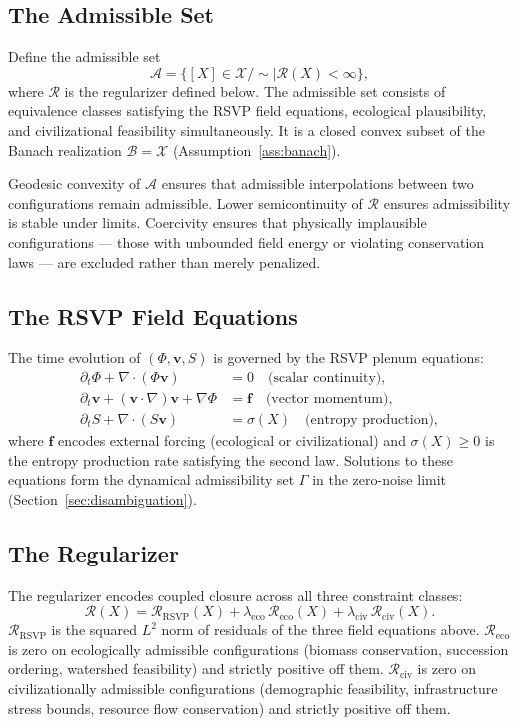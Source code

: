 \documentclass[11pt, oneside]{article}
\begin{document}
\subsection{The Admissible Set}

Define the admissible set
\[
\mathcal{A} = \{ [X] \in \mathcal{X}/{\sim} \mid \mathcal{R}(X) < \infty \},
\]
where $\mathcal{R}$ is the regularizer defined below. The admissible set consists of
equivalence classes satisfying the RSVP field equations, ecological plausibility, and
civilizational feasibility simultaneously. It is a closed convex subset of the Banach
realization $\mathcal{B} = \mathcal{X}$ (Assumption~\ref{ass:banach}).

Geodesic convexity of $\mathcal{A}$ ensures that admissible interpolations between two
configurations remain admissible. Lower semicontinuity of $\mathcal{R}$ ensures
admissibility is stable under limits. Coercivity ensures that physically implausible
configurations --- those with unbounded field energy or violating conservation laws ---
are excluded rather than merely penalized.

\subsection{The RSVP Field Equations}

The time evolution of $(\Phi, \mathbf{v}, S)$ is governed by the RSVP plenum equations:
\begin{align*}
\partial_t \Phi + \nabla \cdot (\Phi \mathbf{v}) &= 0
\quad \text{(scalar continuity)}, \\
\partial_t \mathbf{v} + (\mathbf{v} \cdot \nabla)\mathbf{v} + \nabla\Phi &= \mathbf{f}
\quad \text{(vector momentum)}, \\
\partial_t S + \nabla \cdot (S\mathbf{v}) &= \sigma(X)
\quad \text{(entropy production)},
\end{align*}
where $\mathbf{f}$ encodes external forcing (ecological or civilizational) and
$\sigma(X) \ge 0$ is the entropy production rate satisfying the second law. Solutions
to these equations form the dynamical admissibility set $\Gamma$ in the zero-noise limit
(Section~\ref{sec:disambiguation}).

\subsection{The Regularizer}

The regularizer encodes coupled closure across all three constraint classes:
\[
\mathcal{R}(X) = \mathcal{R}_{\mathrm{RSVP}}(X)
+ \lambda_{\mathrm{eco}}\,\mathcal{R}_{\mathrm{eco}}(X)
+ \lambda_{\mathrm{civ}}\,\mathcal{R}_{\mathrm{civ}}(X).
\]
$\mathcal{R}_{\mathrm{RSVP}}$ is the squared $L^2$ norm of residuals of the three
field equations above. $\mathcal{R}_{\mathrm{eco}}$ is zero on ecologically admissible
configurations (biomass conservation, succession ordering, watershed feasibility) and
strictly positive off them. $\mathcal{R}_{\mathrm{civ}}$ is zero on civilizationally
admissible configurations (demographic feasibility, infrastructure stress bounds,
resource flow conservation) and strictly positive off them.
\end{document}

